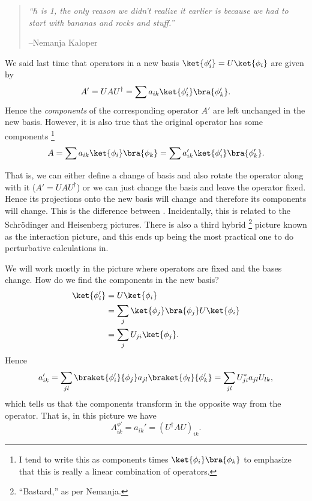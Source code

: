 \begin{quote}
    \textit{``$\hbar$ is 1, the only reason we didn't realize it earlier is because we had to start with bananas and rocks and stuff.''}
    
    --Nemanja Kaloper
\end{quote}


We said last time that operators in a new basis $\ket{\phi'_i} = U\ket{\phi_i}$ are given by
\begin{equation}
    A'= UAU^\dagger=\sum a_{ik} \ket{\phi_i'}\bra{\phi_k'}.
\end{equation}
Hence the \emph{components} of the corresponding operator $A'$ are left unchanged in the new basis. However, it is also true that the original operator has some components%
    \footnote{I tend to write this as components times $\ket{\phi_i}\bra{\phi_k}$ to emphasize that this is really a linear combination of operators.}
\begin{equation}
    A=\sum a_{ik}\ket{\phi_i} \bra{\phi_k} = \sum a_{ik}'\ket{\phi_i'}  \bra{\phi_k'}.
\end{equation}

That is, we can either define a change of basis and also rotate the operator along with it ($A'=UAU^\dagger$) or we can just change the basis and leave the operator fixed. Hence its projections onto the new basis will change and therefore its components will change. This is the difference between . Incidentally, this is related to the Schr\"odinger and Heisenberg pictures. There is also a third hybrid%
    \footnote{``Bastard,'' as per Nemanja.}
picture known as the interaction picture, and this ends up being the most practical one to do perturbative calculations in.

We will work mostly in the picture where operators are fixed and the bases change. How do we find the components in the new basis?
\begin{align}
    \ket{\phi_i'} &= U \ket{\phi_i}\\
        &= \sum_j \ket{\phi_j}\bra{\phi_j}U \ket{\phi_i}\\
        &= \sum_j U_{ji} \ket{\phi_j}.
\end{align}
Hence
\begin{equation}
    a_{ik}'=\sum_{jl} \braket{\phi_i'}{\phi_j} a_{jl} \braket{\phi_l}{\phi_k'} = \sum_{jl} U_{ji}^* a_{jl} U_{lk},
\end{equation}
which tells us that the components transform in the opposite way from the operator. That is, in this picture we have
\begin{equation}
    A^{\phi'}_{ik} = a_{ik}'=(U^\dagger A U)_{ik}.
\end{equation}

